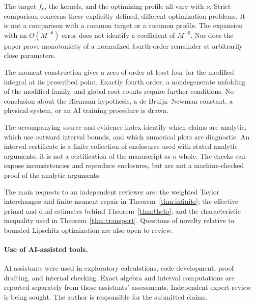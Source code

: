 The target \(f_\nu\), the kernels, and the optimizing profile all vary with
\(\nu\). Strict comparison concerns these explicitly defined, different
optimization problems. It is not a comparison with a common target or a common
profile. The expansion with an \(O(M^{-6})\) error does not identify a coefficient
of \(M^{-6}\). Nor does the paper prove monotonicity of a normalized fourth-order
remainder at arbitrarily close parameters.

The moment construction gives a zero of order at least four for the modified
integral at its prescribed point. Exactly fourth order, a nondegenerate
unfolding of the modified family, and global root counts require further
conditions. No conclusion about the Riemann hypothesis, a de Bruijn--Newman
constant, a physical system, or an AI training procedure is drawn.

The accompanying source and evidence index identify which claims are analytic,
which use outward interval bounds, and which numerical plots are diagnostic.
An interval certificate is a finite collection of enclosures used with stated
analytic arguments; it is not a certification of the manuscript as a whole.
The checks can expose inconsistencies and reproduce enclosures, but are not a
machine-checked proof of the analytic arguments.

The main requests to an independent reviewer are: the weighted Taylor
interchanges and finite moment repair in Theorem~\ref{thm:infinite}; the
effective primal and dual estimates behind Theorem~\ref{thm:theta}; and the
characteristic inequality used in Theorem~\ref{thm:transport}. Questions of
novelty relative to bounded Lipschitz optimization are also open to review.

\paragraph{Use of AI-assisted tools.}
AI assistants were used in exploratory calculations, code development, proof
drafting, and internal checking. Exact algebra and interval computations are
reported separately from those assistants' assessments. Independent expert
review is being sought. The author is responsible for the submitted claims.

\appendix


